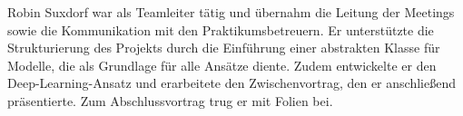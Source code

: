 Robin Suxdorf war als Teamleiter tätig und übernahm die Leitung der Meetings sowie die Kommunikation mit den Praktikumsbetreuern. Er unterstützte die Strukturierung des Projekts durch die Einführung einer abstrakten Klasse für Modelle, die als Grundlage für alle Ansätze diente. Zudem entwickelte er den Deep-Learning-Ansatz und erarbeitete den Zwischenvortrag, den er anschließend präsentierte. Zum Abschlussvortrag trug er mit Folien bei.